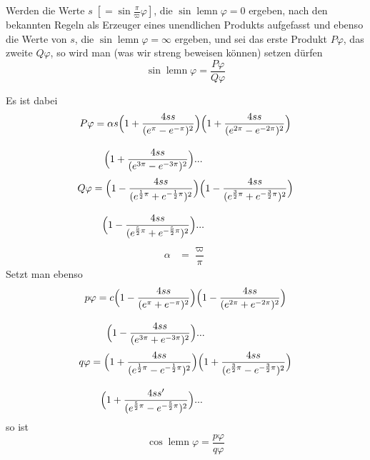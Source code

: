 \begingroup
\renewcommand{\arraystretch}{1.45}
Werden die Werte $s\;[=\sin\frac{\pi}{\varpi}\varphi]$, die $\sin\operatorname{lemn}\varphi=0$ ergeben, nach den bekannten Regeln als Erzeuger eines unendlichen Produkts aufgefasst und ebenso die Werte von $s$, die $\sin\operatorname{lemn}\varphi=\infty$ ergeben, und sei das erste Produkt $P\varphi$, das zweite $Q\varphi$, so wird man (was wir streng beweisen können) setzen dürfen
\[
\sin\operatorname{lemn}\varphi=\dfrac{P\varphi}{Q\varphi}
\]


\noindent Es ist dabei
\[
\begin{aligned}P\varphi &=\alpha s
 \Bigl(1+\dfrac{4ss}{(e^{\pi}-e^{-\pi})^{2}}\Bigr)
 \Bigl(1+\dfrac{4ss}{(e^{2\pi}-e^{-2\pi})^{2}}\Bigr)
 \\[9pt]&\quad{}\Bigl(1+\dfrac{4ss}{(e^{3\pi}-e^{-3\pi})^{2}}\Bigr)\mathord{.}\mathord{.}\mathord{.}\end{aligned}
\]
\[
\begin{aligned}Q\varphi &=
 \Bigl(1-\dfrac{4ss}{(e^{\frac12\pi}+e^{-\frac12\pi})^{2}}\Bigr)
 \Bigl(1-\dfrac{4ss}{(e^{\frac32\pi}+e^{-\frac32\pi})^{2}}\Bigr)
 \\[9pt]&\quad{}\Bigl(1-\dfrac{4ss}{(e^{\frac52\pi}+e^{-\frac52\pi})^{2}}\Bigr)\mathord{.}\mathord{.}\mathord{.}\end{aligned}
\]
\[
\begin{aligned}\alpha &=\dfrac{\varpi}{\pi}\end{aligned}
\]
Setzt man ebenso
\[
\begin{aligned}p\varphi &=c
 \Bigl(1-\dfrac{4ss}{(e^{\pi}+e^{-\pi})^{2}}\Bigr)
 \Bigl(1-\dfrac{4ss}{(e^{2\pi}+e^{-2\pi})^{2}}\Bigr)
 \\[9pt]&\quad{}\Bigl(1-\dfrac{4ss}{(e^{3\pi}+e^{-3\pi})^{2}}\Bigr)\mathord{.}\mathord{.}\mathord{.}\end{aligned}
\]
\[
\begin{aligned}q\varphi &=
 \Bigl(1+\dfrac{4ss}{(e^{\frac12\pi}-e^{-\frac12\pi})^{2}}\Bigr)
 \Bigl(1+\dfrac{4ss}{(e^{\frac32\pi}-e^{-\frac32\pi})^{2}}\Bigr)
 \\[9pt]&\quad{}\Bigl(1+\dfrac{4ss'}{(e^{\frac52\pi}-e^{-\frac52\pi})^{2}}\Bigr)\mathord{.}\mathord{.}\mathord{.}\end{aligned}
\]
\noindent so ist
\[
\cos\operatorname{lemn}\varphi=\dfrac{p\varphi}{q\varphi}
\]
